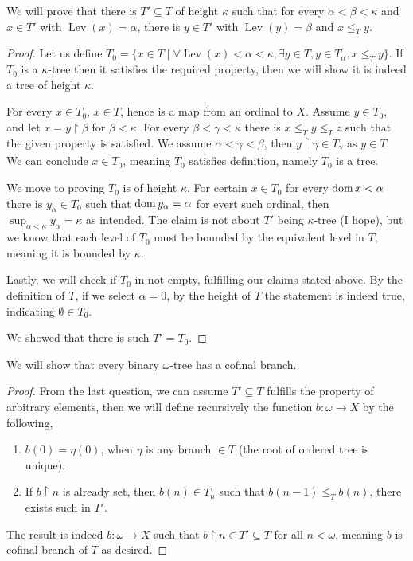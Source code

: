 We will prove that there is $T' \subseteq T$ of height $\kappa$ such that for every $\alpha < \beta < \kappa$ and $x \in T'$ with $\operatorname{Lev}(x) = \alpha$,
there is $y \in T'$ with $\operatorname{Lev}(y) = \beta$ and $x \le_T y$.
\begin{proof}
	Let us define $T_0 = \{ x \in T \mid \forall \operatorname{Lev}(x) < \alpha < \kappa, \exists y \in T, y \in T_\alpha, x \le_T y \}$.
	If $T_0$ is a $\kappa$-tree then it satisfies the required property, then we will show it is indeed a tree of height $\kappa$.

	For every $x \in T_0$, $x \in T$, hence is a map from an ordinal to $X$.
	Assume $y \in T_0$, and let $x = y \restriction \beta$ for $\beta < \kappa$.
	For every $\beta < \gamma < \kappa$ there is $x \le_T y \le_T z$ such that the given property is satisfied.
	We assume $\alpha < \gamma < \beta$, then $y \restriction \gamma \in T_\gamma$ as $y \in T$.
	We can conclude $x \in T_0$, meaning $T_0$ satisfies definition, namely $T_0$ is a tree.

	We move to proving $T_0$ is of height $\kappa$.
	For certain $x \in T_0$ for every $\operatorname{dom} x < \alpha$ there is $y_\alpha \in T_0$ such that $\operatorname{dom} y_\alpha = \alpha$ for evert such ordinal, then $\sup_{\alpha < \kappa} y_\alpha = \kappa$ as intended.
	The claim is not about $T'$ being $\kappa$-tree (I hope), but we know that each level of $T_0$ must be bounded by the equivalent level in $T$, meaning it is bounded by $\kappa$.

	Lastly, we will check if $T_0$ in not empty, fulfilling our claims stated above.
	By the definition of $T$, if we select $\alpha = 0$, by the height of $T$ the statement is indeed true, indicating $\emptyset \in T_0$.

	We showed that there is such $T' = T_0$.
\end{proof}

\question{}
We will show that every binary $\omega$-tree has a cofinal branch.
\begin{proof}
	From the last question, we can assume $T' \subseteq T$ fulfills the property of arbitrary elements, then we will define recursively the function $b : \omega \to X$ by the following,
	\begin{enumerate}
		\item $b(0) = \eta(0)$, when $\eta$ is any branch $\in T$ (the root of ordered tree is unique).
		\item If $b \restriction n$ is already set, then $b(n) \in T_n$ such that $b(n - 1) \le_T b(n)$, there exists such in $T'$.
	\end{enumerate}
	The result is indeed $b : \omega \to X$ such that $b \restriction n \in T' \subseteq T$ for all $n < \omega$,
	meaning $b$ is cofinal branch of $T$ as desired.
\end{proof}

